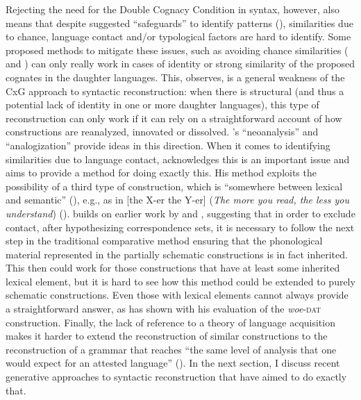 \documentclass[output=paper,colorlinks,citecolor=brown]{langscibook}
\begin{document}
Rejecting the need for the Double Cognacy Condition in syntax, however, also means that despite  suggested “safeguards” to identify patterns (\citealt{mm:harris_historical_1995}), similarities due to chance, language contact and/or typological factors are hard to identify. Some proposed methods to mitigate these issues, such as avoiding chance similarities (\cite[125--130]{mm:serzant_approach_2015} and \citealt{mm:gildea_curious_2020}) can only really work in cases of identity or strong similarity of the proposed cognates in the daughter languages. This, \citet{mm:willis_reconstructing_2011} observes, is a general weakness of the CxG approach to syntactic reconstruction: when there is structural  (and thus a potential lack of identity in one or more daughter languages), this type of reconstruction can only work if it can rely on a straightforward account of how constructions are reanalyzed, innovated or dissolved. \citet[35--38]{mm:traugott_constructionalization_2013}'s “neoanalysis” and “analogization” provide ideas in this direction. When it comes to identifying similarities due to language contact, \citet{mm:daniels_method_2017}  acknowledges this is an important issue and aims to provide a method for doing exactly this. His method exploits the possibility of a third type of construction, which is “somewhere between lexical and semantic” (\cite[382]{mm:daniels_method_2017}), e.g., as in [the X-er the Y-er] (\textit{The more you read, the less you understand}) (\cite[506--508]{mm:fillmore_regularity_1988}). \citet{mm:daniels_method_2017} builds on earlier work by \citet{mm:ross2015argument} and \citet{mm:serzant_approach_2015}, suggesting that in order to exclude contact, after hypothesizing correspondence sets, it is necessary to follow the next step in the traditional comparative method ensuring that the phonological material represented in the partially schematic constructions is in fact inherited. This then could work for those constructions that have at least some inherited lexical element, but it is hard to see how this method could be extended to purely schematic constructions. Even those with lexical elements cannot always provide a straightforward answer, as \citet{mm:clackson2017} has shown with his evaluation of the \textit{woe}-\textsc{dat} construction. Finally, the lack of reference to a theory of language acquisition makes it harder to extend the reconstruction of similar constructions to the reconstruction of a grammar that reaches ``the same level of analysis that one would expect for an attested language'' (\cite[10]{mm:willis_reconstructing_2011}). In the next section, I  discuss recent generative approaches to syntactic reconstruction that have aimed to do exactly that.
\end{document}
